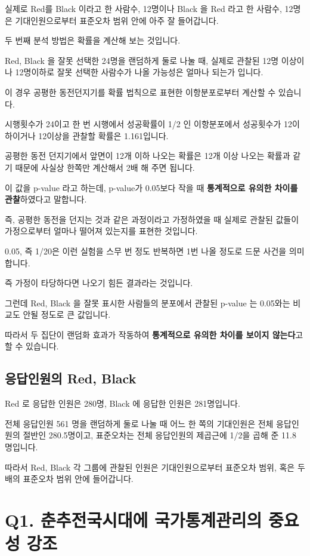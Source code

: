 \documentclass[
]{book}
\begin{document}
실제로 Red를 Black 이라고 한 사람수, 12명이나 Black 을 Red 라고 한 사람수, 12명은 기대인원으로부터 표준오차 범위 안에 아주 잘 들어갑니다.

두 번째 분석 방법은 확률을 계산해 보는 것입니다.

Red, Black 을 잘못 선택한 24명을 랜덤하게 둘로 나눌 때, 실제로 관찰된 12명 이상이나 12명이하로 잘못 선택한 사람수가 나올 가능성은 얼마나 되는가 입니다.

이 경우 공평한 동전던지기를 확률 법칙으로 표현한 이항분포로부터 계산할 수 있습니다.

시행횟수가 24이고 한 번 시행에서 성공확률이 1/2 인 이항분포에서 성공횟수가 12이하이거나 12이상을 관찰할 확률은 1.161입니다.

공평한 동전 던지기에서 앞면이 12개 이하 나오는 확률은 12개 이상 나오는 확률과 같기 때문에 사실상 한쪽만 계산해서 2배 해 주면 됩니다.

이 값을 p-value 라고 하는데, p-value가 0.05보다 작을 때 \textbf{통계적으로 유의한 차이를 관찰}하였다고 말합니다.

즉, 공평한 동전을 던지는 것과 같은 과정이라고 가정하였을 때 실제로 관찰된 값들이 가정으로부터 얼마나 떨어져 있는지를 표현한 것입니다.

0.05, 즉 1/20은 이런 실험을 스무 번 정도 반복하면 1번 나올 정도로 드문 사건을 의미합니다.

즉 가정이 타당하다면 나오기 힘든 결과라는 것입니다.

그런데 Red, Black 을 잘못 표시한 사람들의 분포에서 관찰된 p-value 는 0.05와는 비교도 안될 정도로 큰 값입니다.

따라서 두 집단이 랜덤화 효과가 작동하여 \textbf{통계적으로 유의한 차이를 보이지 않는다}고 할 수 있습니다.

\subsection{응답인원의 Red, Black}\label{uxc751uxb2f5uxc778uxc6d0uxc758-red-black-1}

Red 로 응답한 인원은 280명, Black 에 응답한 인원은 281명입니다.

전체 응답인원 561 명을 랜덤하게 둘로 나눌 때 어느 한 쪽의 기대인원은 전체 응답인원의 절반인 280.5명이고, 표준오차는 전체 응답인원의 제곱근에 1/2을 곱해 준 11.8 명입니다.

따라서 Red, Black 각 그룹에 관찰된 인원은 기대인원으로부터 표준오차 범위, 혹은 두배의 표준오차 범위 안에 들어갑니다.

\section{Q1. 춘추전국시대에 국가통계관리의 중요성 강조}\label{q1.-uxcd98uxcd94uxc804uxad6duxc2dcuxb300uxc5d0-uxad6duxac00uxd1b5uxacc4uxad00uxb9acuxc758-uxc911uxc694uxc131-uxac15uxc870}
\end{document}
